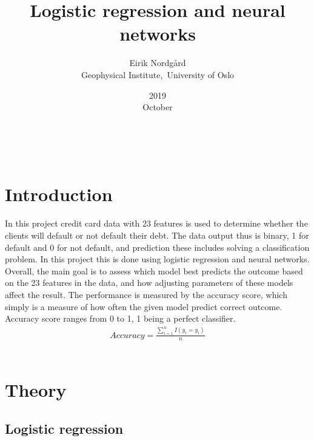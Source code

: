 \documentclass[a4paper,11pt,twocolumn]{article}
\begin{document}
\title{Logistic regression and neural networks}
\date{2019\\ October}
\author{Eirik Nordgård\\ Geophysical Institute,\ University of Oslo}


\

\section{Introduction}

In this project credit card data with 23 features is used to determine whether the clients will default or not default their debt. The data output thus is binary, 1 for default and 0 for not default, and prediction these includes solving a classification problem. In this project this is done using logistic regression and neural networks. Overall, the main goal is to assess which model best predicts the outcome based on the 23 features in the data, and how adjusting parameters of these models affect the result. The performance is measured by the accuracy score, which simply is a measure of how often the given model predict correct outcome. Accuracy score ranges from 0 to 1, 1 being a perfect classifier.    
\begin{gather*}
Accuracy = \frac{\sum\limits_{i=1}^n I(y_i = y_i)}{n}
\end{gather*}
\\

\section{Theory}


\subsection{Logistic regression}
\end{document}
